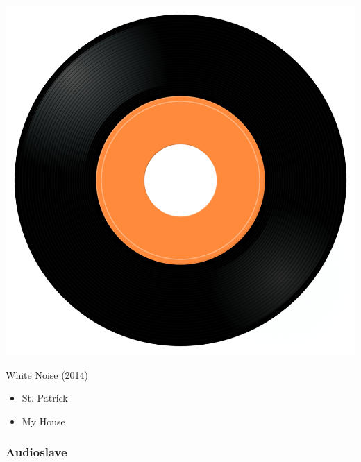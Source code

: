 \begin{minipage}[t]{0.25\textwidth}
\captionsetup{type=figure}
\includegraphics[width=\textwidth]{Images/cover.png}
\caption*{White Noise (2014)}
\end{minipage}
\begin{minipage}[t]{0.25\textwidth}\vspace{0pt}
\begin{itemize}[nosep,leftmargin=1em,labelwidth=*,align=left]
	\setlength{\itemsep}{0pt}
	\item St. Patrick 
	\item My House
\end{itemize}
\end{minipage}

\subsubsection{Audioslave}

